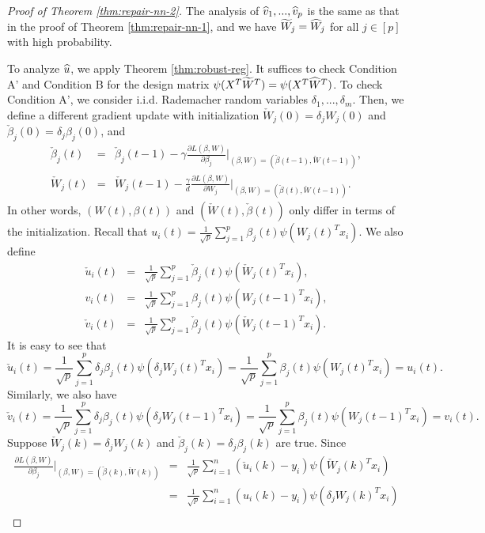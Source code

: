 \begin{proof}[Proof of Theorem \ref{thm:repair-nn-2}]
The analysis of $\widehat{v}_1,...,\widehat{v}_p$ is the same as that in the proof of Theorem \ref{thm:repair-nn-1}, and we have $\widetilde{W}_j=\widehat{W}_j$ for all $j\in[p]$ with high probability.

To analyze $\widehat{u}$, we apply Theorem \ref{thm:robust-reg}. It suffices to check Condition A' and Condition B for the design matrix $\psi(X^T\widetilde{W}^T)=\psi(X^T\widehat{W}^T)$. To check Condition A', we consider i.i.d. Rademacher random variables $\delta_1,...,\delta_m$. Then, we define a different gradient update with initialization $\check{W}_j(0)=\delta_jW_j(0)$ and $\check{\beta}_j(0)=\delta_j\beta_j(0)$, and
\begin{eqnarray*}
\check{\beta}_j(t) &=& \check{\beta}_j(t-1) - \gamma\frac{\partial L(\beta,W)}{\partial \beta_j}|_{(\beta,W)=(\check{\beta}(t-1),\check{W}(t-1))}, \\
\check{W}_j(t) &=& \check{W}_j(t-1) - \frac{\gamma}{d}\frac{\partial L(\beta,W)}{\partial W_j}|_{(\beta,W)=(\check{\beta}(t),\check{W}(t-1))}.
\end{eqnarray*}
In other words, $(W(t),\beta(t))$ and $(\check{W}(t),\check{\beta}(t))$ only differ in terms of the initialization. Recall that $u_i(t)=\frac{1}{\sqrt{p}}\sum_{j=1}^p\beta_j(t)\psi(W_j(t)^Tx_i)$. We also define 
\begin{eqnarray*}
\check{u}_i(t) &=& \frac{1}{\sqrt{p}}\sum_{j=1}^p\check{\beta}_j(t)\psi(\check{W}_j(t)^Tx_i), \\
v_i(t) &=& \frac{1}{\sqrt{p}}\sum_{j=1}^p\beta_j(t)\psi(W_j(t-1)^Tx_i), \\
\check{v}_i(t) &=& \frac{1}{\sqrt{p}}\sum_{j=1}^p\check{\beta}_j(t)\psi(\check{W}_j(t-1)^Tx_i).
\end{eqnarray*}
It is easy to see that
$$\check{u}_i(t)=\frac{1}{\sqrt{p}}\sum_{j=1}^p\delta_j\beta_j(t)\psi(\delta_jW_j(t)^Tx_i)=\frac{1}{\sqrt{p}}\sum_{j=1}^p\beta_j(t)\psi(W_j(t)^Tx_i)=u_i(t).$$
Similarly, we also have
$$\check{v}_i(t)=\frac{1}{\sqrt{p}}\sum_{j=1}^p\delta_j\beta_j(t)\psi(\delta_jW_j(t-1)^Tx_i)=\frac{1}{\sqrt{p}}\sum_{j=1}^p\beta_j(t)\psi(W_j(t-1)^Tx_i)=v_i(t).$$
Suppose $\check{W}_j(k)=\delta_jW_j(k)$ and $\check{\beta}_j(k)=\delta_j\beta_j(k)$ are true. Since
\begin{eqnarray*}
\frac{\partial L(\beta,W)}{\partial \beta_j}|_{(\beta,W)=(\check{\beta}(k),\check{W}(k))} &=& \frac{1}{\sqrt{p}}\sum_{i=1}^n(\check{u}_i(k)-y_i)\psi(\check{W}_j(k)^Tx_i) \\
&=& \frac{1}{\sqrt{p}}\sum_{i=1}^n({u}_i(k)-y_i)\psi(\delta_j{W}_j(k)^Tx_i) \\

\end{eqnarray*}
\end{proof}
